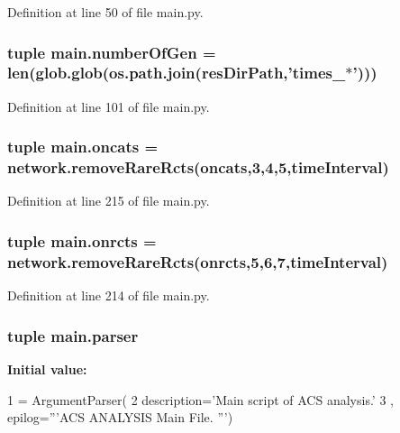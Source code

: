 Definition at line 50 of file main.\-py.

\hypertarget{a00151_aabf82b9e9c2293000a67162becdd440d}{
\subsubsection[{number\-Of\-Gen}]{\setlength{\rightskip}{0pt plus 5cm}tuple main.\-number\-Of\-Gen = len(glob.\-glob(os.\-path.\-join({\bf res\-Dir\-Path},'times\-\_\-$\ast$')))}}\label{a00151_aabf82b9e9c2293000a67162becdd440d}


Definition at line 101 of file main.\-py.

\hypertarget{a00151_ab4d380bc4bfcb970acc39ddf18a73972}{
\subsubsection[{oncats}]{\setlength{\rightskip}{0pt plus 5cm}tuple main.\-oncats = network.\-remove\-Rare\-Rcts(oncats,3,4,5,{\bf time\-Interval})}}\label{a00151_ab4d380bc4bfcb970acc39ddf18a73972}


Definition at line 215 of file main.\-py.

\hypertarget{a00151_ab26ffc3eda5d201a779d705813b06348}{
\subsubsection[{onrcts}]{\setlength{\rightskip}{0pt plus 5cm}tuple main.\-onrcts = network.\-remove\-Rare\-Rcts(onrcts,5,6,7,{\bf time\-Interval})}}\label{a00151_ab26ffc3eda5d201a779d705813b06348}


Definition at line 214 of file main.\-py.

\hypertarget{a00151_a6596d20927a9196bbb33aef704e88297}{
\subsubsection[{parser}]{\setlength{\rightskip}{0pt plus 5cm}tuple main.\-parser}}\label{a00151_a6596d20927a9196bbb33aef704e88297}
{\bfseries Initial value\-:}
\begin{DoxyCode}
1 = ArgumentParser(
2                                 description=\textcolor{stringliteral}{'Main script of ACS analysis.'}
3                                 , epilog=\textcolor{stringliteral}{'''ACS ANALYSIS Main File. '''})
\end{DoxyCode}


